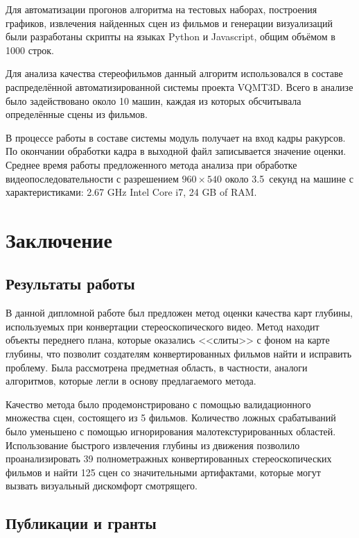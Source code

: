 \documentclass[14pt, a4paper]{extarticle}
\begin{document}
Для автоматизации прогонов алгоритма на тестовых наборах, построения графиков, 
извлечения найденных сцен из фильмов и генерации визуализаций были разработаны 
скрипты на языках Python и Javascript, общим объёмом в 1000 строк. 

Для анализа качества стереофильмов данный алгоритм использовался в составе 
распределённой автоматизированной системы проекта VQMT3D. Всего в анализе было 
задействовано около 10 машин, каждая из которых обсчитывала определённые сцены из фильмов.

В процессе работы в составе системы модуль получает на вход кадры ракурсов. 
По окончании обработки кадра в выходной файл записывается значение оценки. 
Среднее время работы предложенного метода анализа при обработке 
видеопоследовательности с разрешением $960\times540$ около 3.5~секунд
на машине с характеристиками: 2.67 GHz Intel Core i7, 24 GB of RAM. 



\newpage
\section{Заключение}

\subsection{Результаты работы}

В данной дипломной работе был предложен метод оценки качества карт глубины,
используемых при конвертации стереоскопического видео. Метод находит объекты
переднего плана, которые оказались <<слиты>> с фоном на карте глубины,
что позволит создателям конвертированных фильмов найти и исправить проблему.
Была рассмотрена предметная область, в частности, аналоги алгоритмов, которые легли
в основу предлагаемого метода.

Качество метода было продемонстрировано с помощью валидационного множества сцен, 
состоящего из 5 фильмов. Количество ложных срабатываний было уменьшено
с помощью игнорирования малотекстурированных областей. Использование
быстрого извлечения глубины из движения позволило проанализировать 39
полнометражных конвертированных стереоскопических фильмов и найти
125 сцен со значительными артифактами, которые могут вызвать визуальный
дискомфорт смотрящего.

\subsection{Публикации и гранты}
\end{document}

